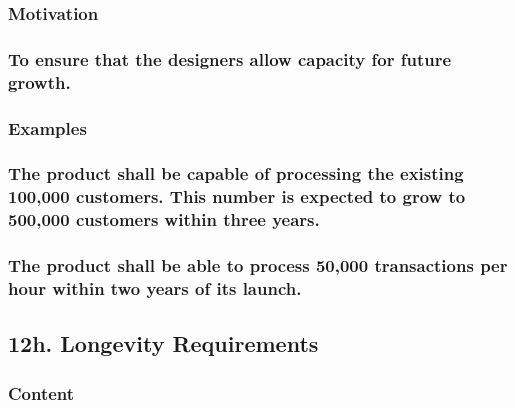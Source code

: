 \documentclass[
]{article}
\begin{document}
\hypertarget{motivation-42}{%
\subsubsection{Motivation}\label{motivation-42}}

\hypertarget{to-ensure-that-the-designers-allow-capacity-for-future-growth.}{%
\subsubsection{To ensure that the designers allow capacity for future
growth.}\label{to-ensure-that-the-designers-allow-capacity-for-future-growth.}}

\hypertarget{examples-27}{%
\subsubsection{Examples}\label{examples-27}}

\hypertarget{the-product-shall-be-capable-of-processing-the-existing-100000-customers.-this-number-is-expected-to-grow-to-500000-customers-within-three-years.}{%
\subsubsection{The product shall be capable of processing the existing
100,000 customers. This number is expected to grow to 500,000 customers
within three
years.}\label{the-product-shall-be-capable-of-processing-the-existing-100000-customers.-this-number-is-expected-to-grow-to-500000-customers-within-three-years.}}

\hypertarget{the-product-shall-be-able-to-process-50000-transactions-per-hour-within-two-years-of-its-launch.}{%
\subsubsection{The product shall be able to process 50,000 transactions
per hour within two years of its
launch.}\label{the-product-shall-be-able-to-process-50000-transactions-per-hour-within-two-years-of-its-launch.}}

\hypertarget{h.-longevity-requirements}{%
\subsection{12h. Longevity
Requirements}\label{h.-longevity-requirements}}

\hypertarget{content-44}{%
\subsubsection{Content}\label{content-44}}
\end{document}
